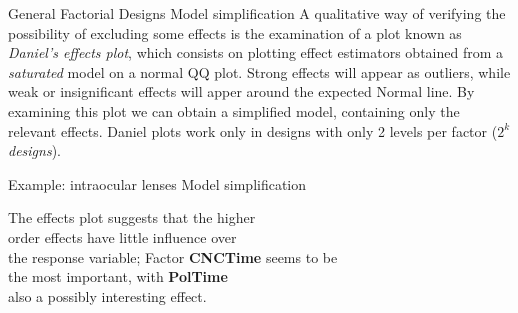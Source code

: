 \documentclass[t]{beamer}
\begin{document}

\begin{ftst}
{General Factorial Designs}
{Model simplification}
A qualitative way of verifying the possibility of excluding some effects is the examination of a plot known as \textit{Daniel's effects plot}, which consists on plotting effect estimators obtained from a \textit{saturated} model on a normal QQ plot.
\vone
Strong effects will appear as outliers, while weak or insignificant effects will apper around the expected Normal line. By examining this plot we can obtain a simplified model, containing only the relevant effects.
\vone
Daniel plots work only in designs with only 2 levels per factor ($2^k$ \textit{designs}).
\end{ftst}


\begin{ftstf}
{Example: intraocular lenses}
{Model simplification}
\vhalf
The effects plot suggests that the higher\\
order effects have little influence over\\
the response variable;
\vhalf
Factor \textbf{CNCTime} seems to be\\
the most important, with \textbf{PolTime}\\
also a possibly interesting effect.
\end{ftstf}
\end{document}
